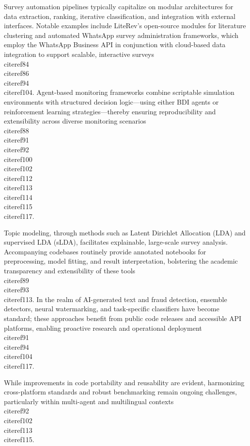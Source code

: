 \documentclass[11pt]{article}
\begin{document}
Survey automation pipelines typically capitalize on modular architectures for data extraction, ranking, iterative classification, and integration with external interfaces. Notable examples include LiteRev’s open-source modules for literature clustering and automated WhatsApp survey administration frameworks, which employ the WhatsApp Business API in conjunction with cloud-based data integration to support scalable, interactive surveys~\\cite{ref84}\\cite{ref86}\\cite{ref94}\\cite{ref104}. Agent-based monitoring frameworks combine scriptable simulation environments with structured decision logic—using either BDI agents or reinforcement learning strategies—thereby ensuring reproducibility and extensibility across diverse monitoring scenarios~\\cite{ref88}\\cite{ref91}\\cite{ref92}\\cite{ref100}\\cite{ref102}\\cite{ref112}\\cite{ref113}\\cite{ref114}\\cite{ref115}\\cite{ref117}.

Topic modeling, through methods such as Latent Dirichlet Allocation (LDA) and supervised LDA (sLDA), facilitates explainable, large-scale survey analysis. Accompanying codebases routinely provide annotated notebooks for preprocessing, model fitting, and result interpretation, bolstering the academic transparency and extensibility of these tools~\\cite{ref89}\\cite{ref93}\\cite{ref113}. In the realm of AI-generated text and fraud detection, ensemble detectors, neural watermarking, and task-specific classifiers have become standard; these approaches benefit from public code releases and accessible API platforms, enabling proactive research and operational deployment~\\cite{ref91}\\cite{ref94}\\cite{ref104}\\cite{ref117}.

While improvements in code portability and reusability are evident, harmonizing cross-platform standards and robust benchmarking remain ongoing challenges, particularly within multi-agent and multilingual contexts~\\cite{ref92}\\cite{ref102}\\cite{ref113}\\cite{ref115}.
\end{document}
